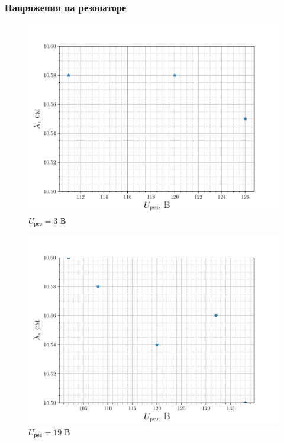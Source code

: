 \subsubsection{Напряжения на резонаторе}
\begin{figure}[H]
		\centering
		\includegraphics[height=0.4\textheight]{fig/ref3V_2}
		\caption{$U_{\text{рез}}=3$ В}
		\label{fig:ref3V_2}
\end{figure}
\begin{figure}[H]
		\centering
		\includegraphics[height=0.4\textheight]{fig/ref19V_2}
		\caption{$U_{\text{рез}}=19$ В}
		\label{fig:ref19V_2}
\end{figure}

